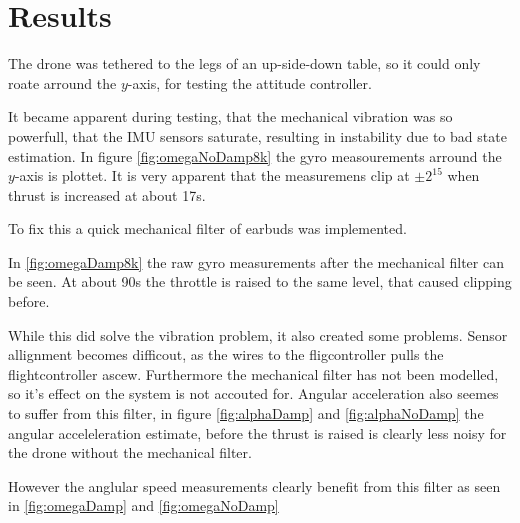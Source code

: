 \section{ Results } %

The drone was tethered to the legs of an up-side-down table, so it could only
roate arround the $y$-axis, for testing the attitude controller.

It became apparent during testing, that the mechanical vibration was so
powerfull, that the IMU sensors saturate, resulting in instability due to bad
state estimation. In figure \ref{fig:omegaNoDamp8k} the gyro measourements
arround the $y$-axis is plottet. It is very apparent that the measuremens clip
at $\pm2^15$ when thrust is increased at about 17s.


To fix this a quick mechanical filter of earbuds was implemented.

In \ref{fig:omegaDamp8k} the raw gyro measurements after the mechanical filter
can be seen. At about 90s the throttle is raised to the same level, that caused
clipping before.


While this did solve the vibration problem, it also created some problems.
Sensor allignment becomes difficout, as the wires to the fligcontroller pulls the
flightcontroller ascew. Furthermore the mechanical filter has not been
modelled, so it's effect on the system is not accouted for.
Angular acceleration also seemes to suffer from this filter, in figure
\ref{fig:alphaDamp} and \ref{fig:alphaNoDamp} the angular acceleleration
estimate, before the thrust is raised is clearly less noisy for the drone
without the mechanical filter.


However the anglular speed measurements clearly benefit from this filter as seen
in \ref{fig:omegaDamp} and \ref{fig:omegaNoDamp}



